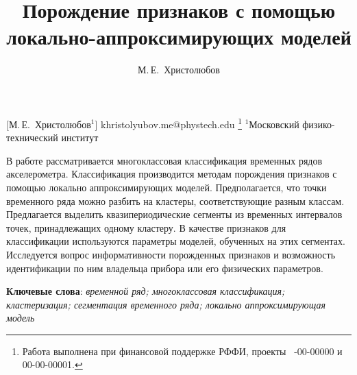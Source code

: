 \documentclass[12pt, twoside]{article}
\begin{document}
\title
    [Порождение признаков с помощью локально-аппроксимирующих моделей] %
    {Порождение признаков с помощью локально-аппроксимирующих моделей}
\author
    [М.\,Е.~Христолюбов] %
    {М.\,Е.~Христолюбов} %
    [М.\,Е.~Христолюбов$^1$] %
\email
    {khristolyubov.me@phystech.edu}
\thanks
    {Работа выполнена при
     финансовой поддержке РФФИ, проекты \No\ -00-00000 и 00-00-00001.}
\organization
    {$^1$Московский физико-технический институт}
\abstract
    {В работе рассматривается многоклассовая классификация временных рядов акселерометра. Классификация производится методам порождения признаков с помощью локально аппроксимирующих моделей. Предполагается, что точки временного ряда можно разбить на кластеры, соответствующие разным классам. Предлагается выделить квазипериодические сегменты из временных интервалов точек, принадлежащих одному кластеру. В качестве признаков для классификации используются параметры моделей, обученных на этих сегментах. Исследуется вопрос информативности порожденных признаков и возможность идентификации по ним владельца прибора или его физических параметров.
	
\bigskip
\noindent
\textbf{Ключевые слова}: \emph {временной ряд; многоклассовая классификация; кластеризация; сегментация временного ряда; локально аппроксимирующая модель}
}
\end{document}
